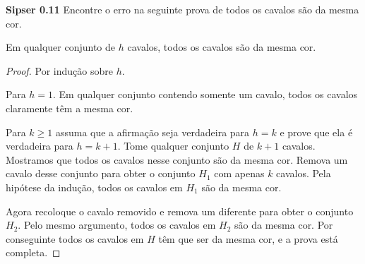 
\noindent \textbf{Sipser 0.11} Encontre o erro na seguinte prova de todos os cavalos são da mesma cor.


\begin{prop}
Em qualquer conjunto de $h$ cavalos, todos os cavalos são da mesma cor.
\end{prop}

\begin{proof} Por indução sobre $h$.

\indbase Para $h = 1$. Em qualquer conjunto contendo somente um cavalo, todos os cavalos claramente têm a mesma cor.

\indstep Para $k \geq 1$ assuma que a afirmação seja verdadeira para $h = k$ e prove que ela é verdadeira para $h = k + 1$. Tome qualquer conjunto $H$ de $k + 1$ cavalos. Mostramos que todos os cavalos nesse conjunto são da mesma cor. Remova um cavalo desse conjunto para obter o conjunto $H_1$ com apenas $k$ cavalos. Pela hipótese da indução, todos os cavalos em $H_1$ são da mesma cor.

Agora recoloque o cavalo removido e remova um diferente para obter o conjunto $H_2$. Pelo mesmo argumento, todos os cavalos em $H_2$ são da mesma cor. Por conseguinte todos os cavalos em $H$ têm que ser da mesma cor, e a prova está
completa.
\end{proof}